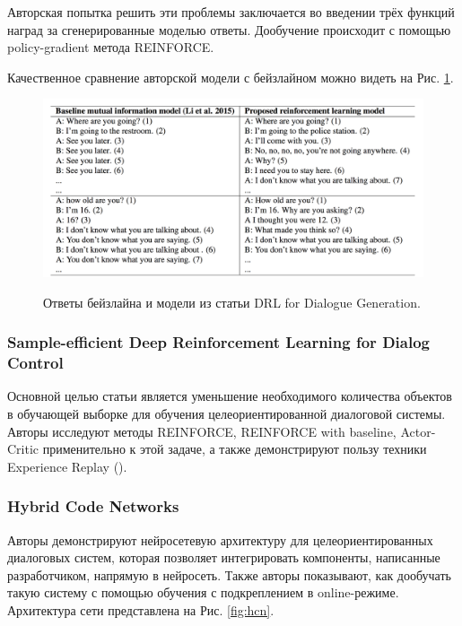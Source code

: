\documentclass[12pt,a4paper]{amsart}
\begin{document}
Авторская попытка решить эти проблемы заключается во введении трёх функций наград за сгенерированные моделью ответы. Дообучение происходит с помощью policy-gradient метода REINFORCE.

Качественное сравнение авторской модели с бейзлайном можно видеть на Рис. \ref{fig:rl-dialog-generation-paper}.

\begin{figure}[htbp!]
	\caption{Ответы бейзлайна и модели из статьи DRL for Dialogue Generation.}
	\includegraphics[width=\textwidth]{imgs/rl-dialog-generation-paper.png}
	\label{fig:rl-dialog-generation-paper}
	\centering
\end{figure}


\subsubsection*{\textbf{Sample-efficient Deep Reinforcement Learning for Dialog Control}}

Основной целью статьи является уменьшение необходимого количества объектов в обучающей выборке для обучения целеориентированной диалоговой системы. Авторы исследуют методы REINFORCE, REINFORCE with baseline, Actor-Critic применительно к этой задаче, а также демонстрируют пользу техники Experience Replay (\cite{DBLP:journals/corr/MnihKSGAWR13}).

\subsubsection*{\textbf{Hybrid Code Networks}}

Авторы демонстрируют нейросетевую архитектуру для целеориентированных диалоговых систем, которая позволяет интегрировать компоненты, написанные разработчиком, напрямую в нейросеть. Также авторы показывают, как дообучать такую систему с помощью обучения с подкреплением в online-режиме. Архитектура сети представлена на Рис. \ref{fig:hcn}.
\end{document}
